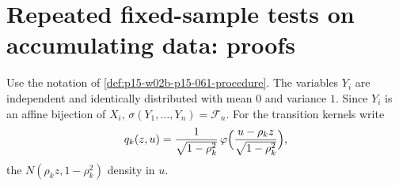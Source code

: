 \section{Repeated fixed-sample tests on accumulating data: proofs}
\label{sec:annex-p15-w02b-p15-061-cumulative-looks}

Use the notation of \cref{def:p15-w02b-p15-061-procedure}. The variables
\(Y_i\) are independent and identically distributed with mean \(0\) and
variance \(1\). Since \(Y_i\) is an affine bijection of \(X_i\),
\(\sigma(Y_1,\ldots,Y_n)=\mathcal F_n\). For the transition kernels write
\[
 q_k(z,u)=\frac1{\sqrt{1-\rho_k^2}}\,
 \varphi\Bigl(\frac{u-\rho_kz}{\sqrt{1-\rho_k^2}}\Bigr),
\]
the \(N(\rho_kz,1-\rho_k^2)\) density in \(u\).

